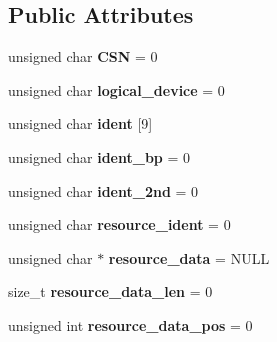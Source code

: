 \subsection*{Public Attributes}
\begin{DoxyCompactItemize}
\item 
\hypertarget{classISAPnPDevice_a3ef534419f26e56b1ca30e83b33587ef}{unsigned char {\bfseries C\-S\-N} = 0}\label{classISAPnPDevice_a3ef534419f26e56b1ca30e83b33587ef}

\item 
\hypertarget{classISAPnPDevice_a64c6b4881d94ee36ffbd5902f35618f5}{unsigned char {\bfseries logical\-\_\-device} = 0}\label{classISAPnPDevice_a64c6b4881d94ee36ffbd5902f35618f5}

\item 
\hypertarget{classISAPnPDevice_a64378b5635e71f680d7606e553802acc}{unsigned char {\bfseries ident} \mbox{[}9\mbox{]}}\label{classISAPnPDevice_a64378b5635e71f680d7606e553802acc}

\item 
\hypertarget{classISAPnPDevice_a679950e054d8888d78eff2b2c6a190ce}{unsigned char {\bfseries ident\-\_\-bp} = 0}\label{classISAPnPDevice_a679950e054d8888d78eff2b2c6a190ce}

\item 
\hypertarget{classISAPnPDevice_a1a7e961359d21f4c9ac98ed9ed3b0064}{unsigned char {\bfseries ident\-\_\-2nd} = 0}\label{classISAPnPDevice_a1a7e961359d21f4c9ac98ed9ed3b0064}

\item 
\hypertarget{classISAPnPDevice_ac4fcd7dcfc7bbf19f1289ed422be136a}{unsigned char {\bfseries resource\-\_\-ident} = 0}\label{classISAPnPDevice_ac4fcd7dcfc7bbf19f1289ed422be136a}

\item 
\hypertarget{classISAPnPDevice_a3ab868b1c70dd0bcf10a1d69074d09c3}{unsigned char $\ast$ {\bfseries resource\-\_\-data} = N\-U\-L\-L}\label{classISAPnPDevice_a3ab868b1c70dd0bcf10a1d69074d09c3}

\item 
\hypertarget{classISAPnPDevice_ac60d20aa084ba430d431810fd57e5318}{size\-\_\-t {\bfseries resource\-\_\-data\-\_\-len} = 0}\label{classISAPnPDevice_ac60d20aa084ba430d431810fd57e5318}

\item 
\hypertarget{classISAPnPDevice_acb56f8c68573a4a5bf3483de48dacb76}{unsigned int {\bfseries resource\-\_\-data\-\_\-pos} = 0}\label{classISAPnPDevice_acb56f8c68573a4a5bf3483de48dacb76}


\end{DoxyCompactItemize}
